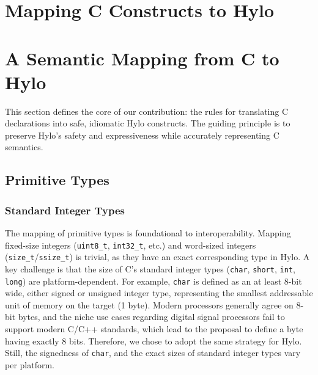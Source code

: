 \section{Mapping C Constructs to Hylo}
\label{sec:mapping_c_constructs}

\section{A Semantic Mapping from C to Hylo}

This section defines the core of our contribution: the rules for translating C declarations into safe, idiomatic Hylo constructs. The guiding principle is to preserve Hylo's safety and expressiveness while accurately representing C semantics.

\subsection{Primitive Types}
\subsubsection{Standard Integer Types}
The mapping of primitive types is foundational to interoperability. Mapping fixed-size integers (\texttt{uint8\_t}, \texttt{int32\_t}, etc.) and word-sized integers (\texttt{size\_t}/\texttt{ssize\_t}) is trivial, as they have an exact corresponding type in Hylo. A key challenge is that the size of C's standard integer types (\texttt{char}, \texttt{short}, \texttt{int}, \texttt{long}) are platform-dependent. For example, \texttt{char} is defined as an at least 8-bit wide, either signed or unsigned integer type, representing the smallest addressable unit of memory on the target (1 byte). Modern processors generally agree on 8-bit bytes, and the niche use cases regarding digital signal processors fail to support modern C/C++ standards, which lead to the proposal \cite{P3477R1} to define a byte having exactly 8 bits. Therefore, we chose to adopt the same strategy for Hylo. Still, the signedness of \texttt{char}, and the exact sizes of standard integer types vary per platform.

